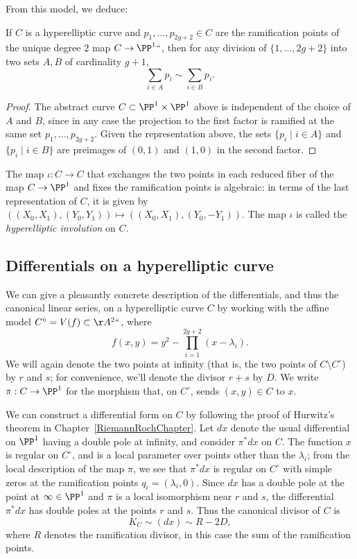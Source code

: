From this model, we deduce:

\begin{corollary}
\label{relation on ramification points}
If $C$ is a hyperelliptic curve  and $p_1,\dots,p_{2g+2} \in C$ are the
ramification points of the unique degree $2$ map $C \to \PP^1` `$, then for any
division of $\{1,\dots,2g+2\}$ into two sets $A,B$ of cardinality $g+1$,
$$
\sum_{i\in A} p_{i}   \sim  \sum_{i\in B}p_{i}.
$$
\end{corollary}

\begin{proof}
The abstract curve $C\subset \PP^{1}\times \PP^{1}$ above
is independent of the
choice of $A$ and $B$,
since in any case the projection to the
first factor
is ramified at the same set $p_{1}, \dots, p_{2g+2}$. Given the
representation above, the sets
$\{p_i\mid i\in A\}$ and  $\{p_i\mid i\in B\}$
are
preimages of $(0,1)$ and
$(1,0)$ in the second factor.
\end{proof}

 The map $\iota : C \to C$ that exchanges the two points in each reduced
 fiber of the map $C \to \PP^1$ and fixes the ramification points is
 algebraic: in terms of the last representation of $C$, it is given by
 $((X_0,X_1), (Y_0,Y_1)) \mapsto  ((X_0,X_1), (Y_0,-Y_1)) $. The map
%
%
 $\iota$ is called the \emph{hyperelliptic involution} on $C$.

\subsection*{Differentials on a hyperelliptic curve}

We can give a pleasantly concrete \null description of the differentials,
and thus the
canonical linear series,
%
%
on a hyperelliptic curve $C$
by working with the affine model $C^\circ = V(f) \subset \AA^2` `$, where
$$
f(x,y) = y^2 - \prod_{i=1}^{2g+2} (x - \lambda_i).
$$
We will again denote the two points at infinity (that is, the two points
of $C \setminus C^\circ$) by $r$ and $s$; for convenience, we'll denote
the divisor $r+s$ by $D$. We write $\pi:C \to \PP^1$ for the morphism
that, on $C^\circ$, sends $(x,y) \in C$ to $x$.

We can construct a differential form on $C$ by following the proof of
Hurwitz's theorem
%
in
Chapter~\ref{RiemannRochChapter}.
Let $dx$ denote the usual differential on $\PP^1$ having a double
pole at infinity, and consider $\pi^*dx$ on $C$.  The function $x$ is
regular on $C^\circ$, and is a local parameter over points other than
the $\lambda_i$; from the local description of the map $\pi$, we see that
$\pi^*dx$ is regular on $C^\circ$  with simple zeros at the ramification
points $q_i = (\lambda_i, 0)$. Since $dx$ has a double pole at the
point at $\infty\in \PP^1$ and $\pi$ is a local isomorphism near $r$
and $s$, the differential $\pi^*dx$ has double poles at the points $r$
and $s$. Thus the canonical
divisor of $C$ is
$$
 K_C \sim (dx) \sim R - 2D,
$$
where $R$ denotes the ramification divisor, in this case the sum of the
ramification points.

